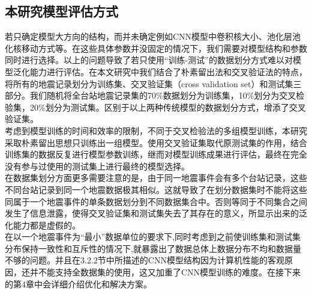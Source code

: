 \subsection{本研究模型评估方式}
\indent 若只确定模型大方向的结构，而并未确定例如CNN模型中卷积核大小、池化层池化核移动方式等。在这些具体参数并没固定的情况下，我们需要对模型结构和参数同时进行选择。以上的问题导致了若只使用“训练-测试”的数据划分方式难以对模型泛化能力进行评估。在本文研究中我们结合了朴素留出法和交叉验证法的特点，将所有的地震记录划分为训练集、交叉验证集（cross validation set）和测试集三部分。我们随机将全台站地震记录集的70\%数据划分为训练集，10\%划分为交叉检验集，20\%划分为测试集。区别于以上两种传统模型的数据划分方式，增添了交叉验证集。\\
\indent 考虑到模型训练的时间和效率的限制，不同于交叉检验法的多组模型训练，本研究采取朴素留出思想只训练出一组模型。使用交叉验证集取代原测试集的作用，结合训练集的数据反复进行模型参数训练，继而对模型训练成果进行评估，最终在完全没有参与过使用的测试集上进行最终的模型选择。\\
\indent 在数据集划分方面更多需要注意的是，由于同一地震事件会有多个台站记录，这些不同台站记录到同一个地震数据极其相似。这就导致了在划分数据集时不能将这些同属于一个地震事件的单条数据划分到不同数据集合中。否则等同于不同集合之间发生了信息泄露，使得交叉验证集和测试集失去了其存在的意义，所显示出来的泛化能力都是虚假的。\\
\indent 在以一个地震事件为“最小”数据单位的要求下,同时考虑到之前使训练集和测试集分布保持一致性和互斥性的情况下,就暴露出了数据总体上数据分布不均和数据量不够的问题。并且在3.2.2节中所描述的CNN模型结构因为计算机性能的客观原因，还并不能支持全数据集的使用，这又加重了CNN模型训练的难度。在接下来的第4章中会详细介绍优化和解决方案。\\